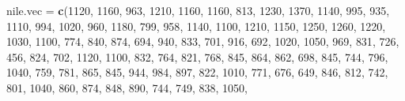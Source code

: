 \documentclass[
]{book}
\newenvironment{Shaded}{\begin{snugshade}}{\end{snugshade}}
\newcommand{\DecValTok}[1]{\textcolor[rgb]{0.00,0.00,0.81}{#1}}
\newcommand{\FunctionTok}[1]{\textcolor[rgb]{0.13,0.29,0.53}{\textbf{#1}}}
\newcommand{\NormalTok}[1]{#1}
\newcommand{\OtherTok}[1]{\textcolor[rgb]{0.56,0.35,0.01}{#1}}
\begin{document}
\begin{Shaded}
\begin{Highlighting}[]
\NormalTok{nile.vec }\OtherTok{=} \FunctionTok{c}\NormalTok{(}\DecValTok{1120}\NormalTok{, }\DecValTok{1160}\NormalTok{, }\DecValTok{963}\NormalTok{, }\DecValTok{1210}\NormalTok{, }\DecValTok{1160}\NormalTok{, }\DecValTok{1160}\NormalTok{, }\DecValTok{813}\NormalTok{, }\DecValTok{1230}\NormalTok{, }\DecValTok{1370}\NormalTok{, }\DecValTok{1140}\NormalTok{, }\DecValTok{995}\NormalTok{, }\DecValTok{935}\NormalTok{, }\DecValTok{1110}\NormalTok{, }\DecValTok{994}\NormalTok{,}
\DecValTok{1020}\NormalTok{, }\DecValTok{960}\NormalTok{, }\DecValTok{1180}\NormalTok{, }\DecValTok{799}\NormalTok{, }\DecValTok{958}\NormalTok{, }\DecValTok{1140}\NormalTok{, }\DecValTok{1100}\NormalTok{, }\DecValTok{1210}\NormalTok{, }\DecValTok{1150}\NormalTok{, }\DecValTok{1250}\NormalTok{, }\DecValTok{1260}\NormalTok{, }\DecValTok{1220}\NormalTok{, }\DecValTok{1030}\NormalTok{, }\DecValTok{1100}\NormalTok{, }\DecValTok{774}\NormalTok{, }\DecValTok{840}\NormalTok{,}
\DecValTok{874}\NormalTok{, }\DecValTok{694}\NormalTok{, }\DecValTok{940}\NormalTok{, }\DecValTok{833}\NormalTok{, }\DecValTok{701}\NormalTok{, }\DecValTok{916}\NormalTok{, }\DecValTok{692}\NormalTok{, }\DecValTok{1020}\NormalTok{, }\DecValTok{1050}\NormalTok{, }\DecValTok{969}\NormalTok{, }\DecValTok{831}\NormalTok{, }\DecValTok{726}\NormalTok{, }\DecValTok{456}\NormalTok{, }\DecValTok{824}\NormalTok{, }\DecValTok{702}\NormalTok{, }\DecValTok{1120}\NormalTok{, }\DecValTok{1100}\NormalTok{, }\DecValTok{832}\NormalTok{,}
\DecValTok{764}\NormalTok{, }\DecValTok{821}\NormalTok{, }\DecValTok{768}\NormalTok{, }\DecValTok{845}\NormalTok{, }\DecValTok{864}\NormalTok{, }\DecValTok{862}\NormalTok{, }\DecValTok{698}\NormalTok{, }\DecValTok{845}\NormalTok{, }\DecValTok{744}\NormalTok{, }\DecValTok{796}\NormalTok{, }\DecValTok{1040}\NormalTok{, }\DecValTok{759}\NormalTok{, }\DecValTok{781}\NormalTok{, }\DecValTok{865}\NormalTok{, }\DecValTok{845}\NormalTok{, }\DecValTok{944}\NormalTok{, }\DecValTok{984}\NormalTok{, }\DecValTok{897}\NormalTok{,}
\DecValTok{822}\NormalTok{, }\DecValTok{1010}\NormalTok{, }\DecValTok{771}\NormalTok{, }\DecValTok{676}\NormalTok{, }\DecValTok{649}\NormalTok{, }\DecValTok{846}\NormalTok{, }\DecValTok{812}\NormalTok{, }\DecValTok{742}\NormalTok{, }\DecValTok{801}\NormalTok{, }\DecValTok{1040}\NormalTok{, }\DecValTok{860}\NormalTok{, }\DecValTok{874}\NormalTok{, }\DecValTok{848}\NormalTok{, }\DecValTok{890}\NormalTok{, }\DecValTok{744}\NormalTok{, }\DecValTok{749}\NormalTok{, }\DecValTok{838}\NormalTok{, }\DecValTok{1050}\NormalTok{,}

\end{Highlighting}
\end{Shaded}
\end{document}
